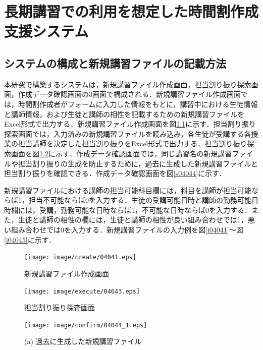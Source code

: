 \chapter{長期講習での利用を想定した時間割作成支援システム}
\section{システムの構成と新規講習ファイルの記載方法}
本研究で構築するシステムは，新規講習ファイル作成画面，担当割り振り探索画面，作成データ確認画面の3画面で構成される．新規講習ファイル作成画面では，時間割作成者がフォームに入力した情報をもとに，講習中における生徒情報と講師情報，および生徒と講師の相性を記載するための新規講習ファイルをExcel形式で出力する．新規講習ファイル作成画面を図\ref{s04041}に示す．担当割り振り探索画面では，入力済みの新規講習ファイルを読み込み，各生徒が受講する各授業の担当講師を決定した担当割り振りをExcel形式で出力する．担当割り振り探索画面を図\ref{s04043}に示す．作成データ確認画面では，同じ講習名の新規講習ファイルや担当割り振りの生成を防止するために，過去に生成した新規講習ファイルと担当割り振りを確認できる．作成データ確認画面を図\ref{s04044}に示す．

新規講習ファイルにおける講師の担当可能科目欄には，科目を講師が担当可能ならば1，担当不可能ならば0を入力する．生徒の受講可能日時と講師の勤務可能日時欄には，受講，勤務可能な日時ならば1，不可能な日時ならば0を入力する．また，生徒と講師の相性の欄には，生徒と講師の相性が良い組み合わせでは1，悪い組み合わせでは0を入力する．新規講習ファイルの入力例を図\ref{i04041}〜図\ref{i04045}に示す．

\begin{figure}[htbp]
\begin{center}
\texttt{[image: image/create/04041.eps]}
\caption{新規講習ファイル作成画面}
\label{s04041}
\end{center}
\end{figure}

\begin{figure}[htbp]
\begin{center}
\texttt{[image: image/execute/04043.eps]}
\caption{担当割り振り探査画面}
\label{s04043}
\end{center}
\end{figure}

\begin{figure}[htbp]
\begin{center}
\texttt{[image: image/confirm/04044\_1.eps]}

    (a) 過去に生成した新規講習ファイル\\
\end{center}
\end{figure}

